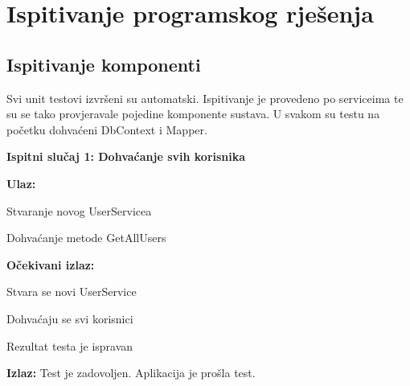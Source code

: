			\eject 
		
	
		\section{Ispitivanje programskog rješenja}
			
			\subsection{Ispitivanje komponenti}
			

			
			\par
			Svi unit testovi izvršeni su automatski. Ispitivanje je provedeno po serviceima te su se tako provjeravale pojedine komponente sustava. U svakom su testu na početku dohvaćeni DbContext i Mapper.
		
			
			\noindent \textbf{Ispitni slučaj 1: Dohvaćanje svih korisnika}
			
			\noindent \textbf{Ulaz:}
			
			\begin{packed_enum}
				
				\item Stvaranje novog UserServicea
				\item Dohvaćanje metode GetAllUsers
				
			\end{packed_enum}
		
			\noindent \textbf{Očekivani izlaz:}
		
			\begin{packed_enum}
			
				\item Stvara se novi UserService
				\item Dohvaćaju se svi korisnici
				\item Rezultat testa je ispravan
			
			\end{packed_enum}
		
			\noindent \textbf{Izlaz:} Test je zadovoljen. Aplikacija je prošla test.
			
